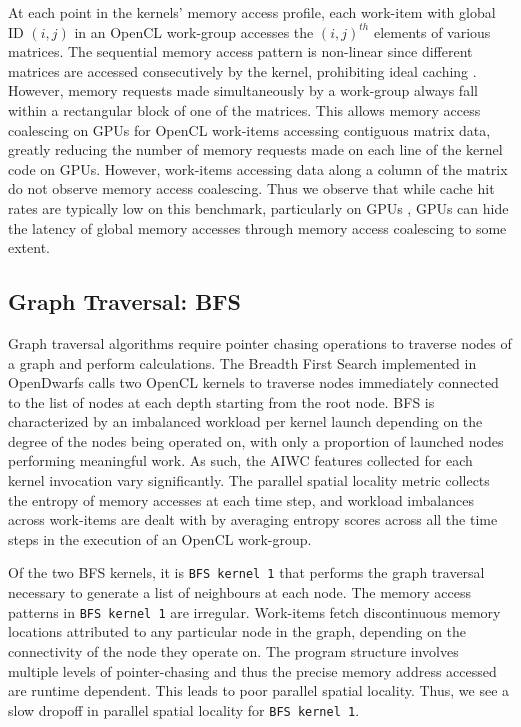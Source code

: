 \documentclass[review=false, sigchi]{acmart}
\begin{document}
	At each point in the kernels' memory access profile, each work-item with global ID $(i,j)$ in an OpenCL work-group accesses the $(i,j)^{th}$ elements of various matrices. The sequential memory access pattern is non-linear since different matrices are accessed consecutively by the kernel, prohibiting ideal caching \cite{krommydas2016opendwarfs}. However, memory requests made simultaneously by a work-group always fall within a rectangular block of one of the matrices. 
	This allows memory access coalescing on GPUs for OpenCL work-items accessing contiguous matrix data, greatly reducing the number of memory requests made on each line of the kernel code on GPUs. 
	However, work-items accessing data along a column of the matrix do not observe memory access coalescing.
	Thus we observe that while cache hit rates are typically low on this benchmark, particularly on GPUs \cite{krommydas2016opendwarfs}, GPUs can hide the latency of global memory accesses through memory access coalescing to some extent.
	
	\subsection{Graph Traversal: BFS}
	
	Graph traversal algorithms require pointer chasing operations to traverse nodes of a graph and perform calculations. 
	The Breadth First Search implemented in OpenDwarfs calls two OpenCL kernels to traverse nodes immediately connected to the list of nodes at each depth starting from the root node. 
	BFS is characterized by an imbalanced workload per kernel launch depending on the degree of the nodes being operated on, with only a proportion of launched nodes performing meaningful work. 
	As such, the AIWC features collected for each kernel invocation vary significantly. 
	The parallel spatial locality metric collects the entropy of memory accesses at each time step, and workload imbalances across work-items are dealt with by averaging entropy scores across all the time steps in the execution of an OpenCL work-group. 
	
	Of the two BFS kernels, it is \texttt{BFS kernel 1} that performs the graph traversal necessary to generate a list of neighbours at each node. The memory access patterns in \texttt{BFS kernel 1} are irregular. 
	Work-items fetch discontinuous memory locations attributed to any particular node in the graph, depending on the connectivity of the node they operate on. 
	The program structure involves multiple levels of pointer-chasing and thus the precise memory address accessed are runtime dependent. 
	This leads to poor parallel spatial locality. Thus, we see a slow dropoff in parallel spatial locality for \texttt{BFS kernel 1}.
	
\end{document}
